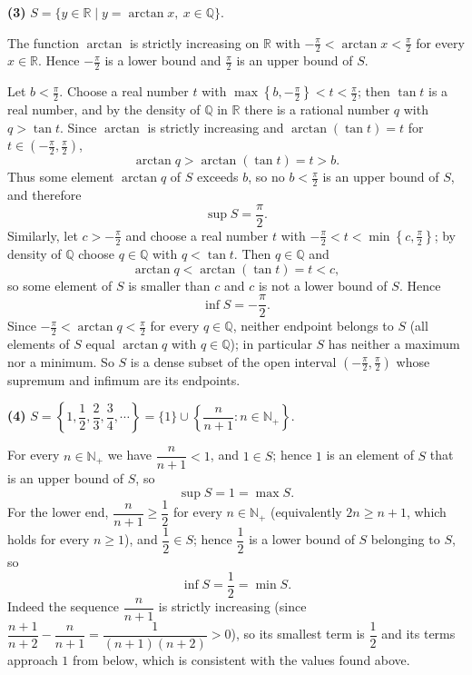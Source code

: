 \documentclass[11pt,a4paper]{article}
\newenvironment{solution}[1]{%
  \par\addvspace{1.7ex}%
  \noindent{\color{solutioncolor}\textbf{#1}}\hspace{0.55em}\ignorespaces}%
  {\par\addvspace{0.9ex}}
\begin{document}
\begin{solution}{Solution 2.4.4}
\medskip
\noindent\textbf{(3)} $S = \{y \in \mathbb{R} \mid y = \arctan x,\ x \in \mathbb{Q}\}$.

The function $\arctan$ is strictly increasing on $\mathbb{R}$ with $-\frac{\pi}{2} < \arctan x < \frac{\pi}{2}$ for every $x \in \mathbb{R}$. Hence $-\frac{\pi}{2}$ is a lower bound and $\frac{\pi}{2}$ is an upper bound of $S$.

Let $b < \frac{\pi}{2}$. Choose a real number $t$ with $\max\left\{b, -\frac{\pi}{2}\right\} < t < \frac{\pi}{2}$; then $\tan t$ is a real number, and by the density of $\mathbb{Q}$ in $\mathbb{R}$ there is a rational number $q$ with $q > \tan t$. Since $\arctan$ is strictly increasing and $\arctan(\tan t) = t$ for $t \in \left(-\frac{\pi}{2}, \frac{\pi}{2}\right)$,
\[
\arctan q > \arctan(\tan t) = t > b .
\]
Thus some element $\arctan q$ of $S$ exceeds $b$, so no $b < \frac{\pi}{2}$ is an upper bound of $S$, and therefore
\[
\sup S = \frac{\pi}{2} .
\]
Similarly, let $c > -\frac{\pi}{2}$ and choose a real number $t$ with $-\frac{\pi}{2} < t < \min\left\{c, \frac{\pi}{2}\right\}$; by density of $\mathbb{Q}$ choose $q \in \mathbb{Q}$ with $q < \tan t$. Then $q \in \mathbb{Q}$ and
\[
\arctan q < \arctan(\tan t) = t < c ,
\]
so some element of $S$ is smaller than $c$ and $c$ is not a lower bound of $S$. Hence
\[
\inf S = -\frac{\pi}{2} .
\]
Since $-\frac{\pi}{2} < \arctan q < \frac{\pi}{2}$ for every $q \in \mathbb{Q}$, neither endpoint belongs to $S$ (all elements of $S$ equal $\arctan q$ with $q \in \mathbb{Q}$); in particular $S$ has neither a maximum nor a minimum. So $S$ is a dense subset of the open interval $\left(-\frac{\pi}{2}, \frac{\pi}{2}\right)$ whose supremum and infimum are its endpoints.

\medskip
\noindent\textbf{(4)} $S = \left\{1, \dfrac{1}{2}, \dfrac{2}{3}, \dfrac{3}{4}, \cdots \right\} = \{1\} \cup \left\{\dfrac{n}{n+1} : n \in \mathbb{N}_+\right\}$.

For every $n \in \mathbb{N}_+$ we have $\dfrac{n}{n+1} < 1$, and $1 \in S$; hence $1$ is an element of $S$ that is an upper bound of $S$, so
\[
\sup S = 1 = \max S .
\]
For the lower end, $\dfrac{n}{n+1} \ge \dfrac{1}{2}$ for every $n \in \mathbb{N}_+$ (equivalently $2n \ge n+1$, which holds for every $n \ge 1$), and $\dfrac{1}{2} \in S$; hence $\dfrac{1}{2}$ is a lower bound of $S$ belonging to $S$, so
\[
\inf S = \frac{1}{2} = \min S .
\]
Indeed the sequence $\dfrac{n}{n+1}$ is strictly increasing (since $\dfrac{n+1}{n+2} - \dfrac{n}{n+1} = \dfrac{1}{(n+1)(n+2)} > 0$), so its smallest term is $\dfrac{1}{2}$ and its terms approach $1$ from below, which is consistent with the values found above.
\end{solution}
\end{document}
